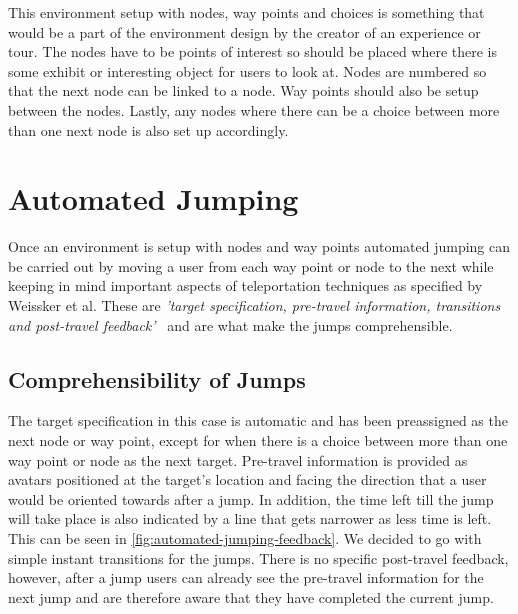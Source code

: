 This environment setup with nodes, way points and choices is something that would be a part of the environment design by the creator of an experience or tour. The nodes have to be points of interest so should be placed where there is some exhibit or interesting object for users to look at. Nodes are numbered so that the next node can be linked to a node. Way points should also be setup between the nodes. Lastly, any nodes where there can be a choice between more than one next node is also set up accordingly.
 
\section{Automated Jumping}
\label{section AGJ: Automated Jumping}
Once an environment is setup with nodes and way points automated jumping can be carried out by moving a user from each way point or node to the next while keeping in mind important aspects of teleportation techniques as specified by Weissker et al. These are \textit{'target specification, pre-travel information, transitions and post-travel feedback'}~\cite{Weissker2018} and are what make the jumps comprehensible.

\subsection{Comprehensibility of Jumps}
\label{subsection AGJ AJ: Comprehensibility of Jumps}
The target specification in this case is automatic and has been preassigned as the next node or way point, except for when there is a choice between more than one way point or node as the next target. Pre-travel information is provided as avatars positioned at the target's location and facing the direction that a user would be oriented towards after a jump. In addition, the time left till the jump will take place is also indicated by a line that gets narrower as less time is left. This can be seen in \cref{fig:automated-jumping-feedback}. We decided to go with simple instant transitions for the jumps. There is no specific post-travel feedback, however, after a jump users can already see the pre-travel information for the next jump and are therefore aware that they have completed the current jump. 

